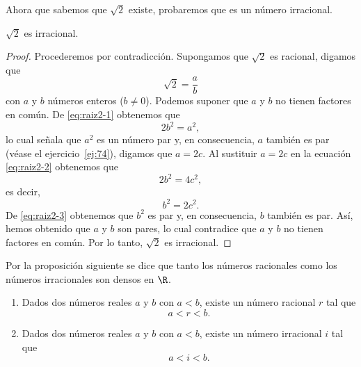 \documentclass[12pt,a4paper]{book}
\begin{document}
    Ahora que sabemos que $\sqrt{2}$ existe, probaremos que es un número irracional.

    \begin{proposicion}\label{prop:20}
        $\sqrt{2}$ es irracional.
    \end{proposicion}

    \begin{proof}
        Procederemos por contradicción. Supongamos que $\sqrt{2}$ es
        racional, digamos que
        \begin{equation}\label{eq:raiz2-1}
            \sqrt{2}=\frac{a}{b}
        \end{equation}
        con $a$ y $b$ números enteros ($b\neq 0$). Podemos suponer que $a$ y $b$ no tienen
        factores en común. De \eqref{eq:raiz2-1} obtenemos que
        \begin{equation}\label{eq:raiz2-2}
            2b^{2}=a^{2},
        \end{equation}
        lo cual señala que $a^{2}$ es un número par y, en consecuencia, $a$ también es par
        (véase el ejercicio~\ref{ej:74}), digamos que $a=2c$. Al sustituir $a=2c$ en la ecuación
        \eqref{eq:raiz2-2} obtenemos que
        \begin{equation*}
            2b^{2}=4c^{2},
        \end{equation*}
        es decir,
        \begin{equation}\label{eq:raiz2-3}
            b^{2}=2c^{2}.
        \end{equation}
        De \eqref{eq:raiz2-3} obtenemos que $b^{2}$ es par y, en consecuencia, $b$ también es par. Así,
        hemos obtenido que $a$ y $b$ son pares, lo cual contradice que $a$ y $b$ no tienen
        factores en común. Por lo tanto, $\sqrt{2}$ es irracional.
    \end{proof}

    Por la proposición siguiente se dice que tanto los números racionales como
    los números irracionales son densos en $\R$.

    \begin{proposicion}\label{prop:21}
        \begin{enumerate}
            \item Dados dos números reales $a$ y $b$ con $a<b$, existe un número racional $r$ tal
            que
            \begin{equation*}
                a<r<b.
            \end{equation*}
            \item Dados dos números reales $a$ y $b$ con $a<b$, existe un número irracional $i$
            tal que
            \begin{equation*}
                a<i<b.
            \end{equation*}
        \end{enumerate}
    \end{proposicion}
\end{document}
